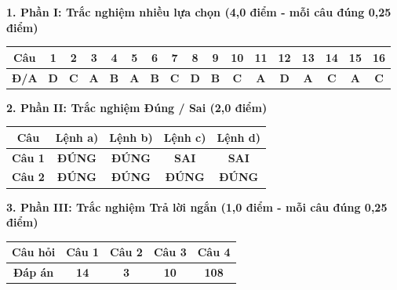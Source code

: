 \documentclass[11pt,a4paper]{article}
\begin{document}
\vspace{2pt}
\noindent
\textbf{\color{mainGreen}1. Phần I: Trắc nghiệm nhiều lựa chọn (4,0 điểm - mỗi câu đúng 0,25 điểm)}
\begin{center}
\renewcommand{\arraystretch}{1.2}
\small
\begin{tabular}{|c|c|c|c|c|c|c|c|c|c|c|c|c|c|c|c|c|}
\hline
\rowcolor{tableGreen}
\textbf{Câu} & \textbf{1} & \textbf{2} & \textbf{3} & \textbf{4} & \textbf{5} & \textbf{6} & \textbf{7} & \textbf{8} & \textbf{9} & \textbf{10} & \textbf{11} & \textbf{12} & \textbf{13} & \textbf{14} & \textbf{15} & \textbf{16} \\
\hline
\textbf{Đ/A} & \textbf{\color{hfRed}D} & \textbf{\color{hfRed}C} & \textbf{\color{hfRed}A} & \textbf{\color{hfRed}B} & \textbf{\color{hfRed}A} & \textbf{\color{hfRed}B} & \textbf{\color{hfRed}C} & \textbf{\color{hfRed}D} & \textbf{\color{hfRed}B} & \textbf{\color{hfRed}C} & \textbf{\color{hfRed}A} & \textbf{\color{hfRed}D} & \textbf{\color{hfRed}A} & \textbf{\color{hfRed}C} & \textbf{\color{hfRed}A} & \textbf{\color{hfRed}C} \\
\hline
\end{tabular}
\end{center}

\vspace{2pt}
\noindent
\textbf{\color{mainGreen}2. Phần II: Trắc nghiệm Đúng / Sai (2,0 điểm)}
\begin{center}
\renewcommand{\arraystretch}{1.2}
\begin{tabular}{|c|c|c|c|c|}
\hline
\rowcolor{tableGreen}
\textbf{Câu} & \textbf{Lệnh a)} & \textbf{Lệnh b)} & \textbf{Lệnh c)} & \textbf{Lệnh d)} \\
\hline
\textbf{Câu 1} & \textbf{\color{hfRed}ĐÚNG} & \textbf{\color{hfRed}ĐÚNG} & \textbf{\color{solBlue}SAI} & \textbf{\color{solBlue}SAI} \\
\hline
\textbf{Câu 2} & \textbf{\color{hfRed}ĐÚNG} & \textbf{\color{hfRed}ĐÚNG} & \textbf{\color{hfRed}ĐÚNG} & \textbf{\color{hfRed}ĐÚNG} \\
\hline
\end{tabular}
\end{center}

\vspace{2pt}
\noindent
\textbf{\color{mainGreen}3. Phần III: Trắc nghiệm Trả lời ngắn (1,0 điểm - mỗi câu đúng 0,25 điểm)}
\begin{center}
\renewcommand{\arraystretch}{1.2}
\begin{tabular}{|c|c|c|c|c|}
\hline
\rowcolor{tableGreen}
\textbf{Câu hỏi} & \textbf{Câu 1} & \textbf{Câu 2} & \textbf{Câu 3} & \textbf{Câu 4} \\
\hline
\textbf{Đáp án} & \textbf{\color{hfRed}14} & \textbf{\color{hfRed}3} & \textbf{\color{hfRed}10} & \textbf{\color{hfRed}108} \\
\hline
\end{tabular}
\end{center}
\end{document}
